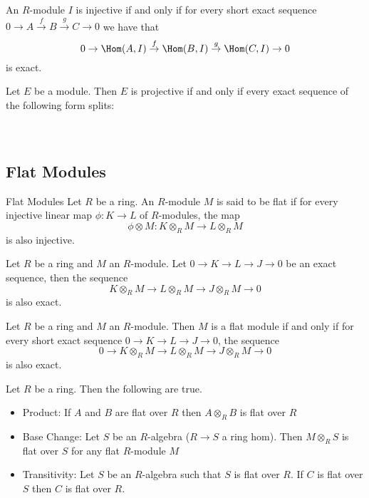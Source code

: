 \documentclass[a4paper]{article}
\begin{document}
\begin{thm}{}{} An $R$-module $I$ is injective if and only if for every short exact sequence $0\to A\overset{f}{\to}B\overset{g}{\to}C\to 0$ we have that $$0\to \Hom(A,I)\overset{f}{\to}\Hom(B,I)\overset{g}{\to}\Hom(C,I)\to 0$$
is exact. 
\end{thm}

\begin{prp}{}{} Let $E$ be a module. Then $E$ is projective if and only if every exact sequence of the following form splits: \\~\\
 \\
\end{prp}

\subsection{Flat Modules}
\begin{defn}{Flat Modules}{} Let $R$ be a ring. An $R$-module $M$ is said to be flat if for every injective linear map $\phi:K\to L$ of $R$-modules, the map $$\phi\otimes M:K\otimes_RM\to L\otimes_RM$$ is also injective. 
\end{defn}

\begin{thm}{}{} Let $R$ be a ring and $M$ an $R$-module. Let $0\to K\to L\to J\to 0$ be an exact sequence, then the sequence $$K\otimes_RM\to L\otimes_RM\to J\otimes_RM\to 0$$ is also exact. 
\end{thm}

\begin{thm}{}{} Let $R$ be a ring and $M$ an $R$-module. Then $M$ is a flat module if and only if for every short exact sequence $0\to K\to L\to J\to 0$, the sequence $$0\to K\otimes_RM\to L\otimes_RM\to J\otimes_RM\to 0$$ is also exact. 
\end{thm}

\begin{thm}{}{} Let $R$ be a ring. Then the following are true. 
\begin{itemize}
\item Product: If $A$ and $B$ are flat over $R$ then $A\otimes_R B$ is flat over $R$
\item Base Change: Let $S$ be an $R$-algebra ($R\to S$ a ring hom). Then $M\otimes_RS$ is flat over $S$ for any flat $R$-module $M$
\item Transitivity: Let $S$ be an $R$-algebra such that $S$ is flat over $R$. If $C$ is flat over $S$ then $C$ is flat over $R$. 
\end{itemize}
\end{thm}
\end{document}
